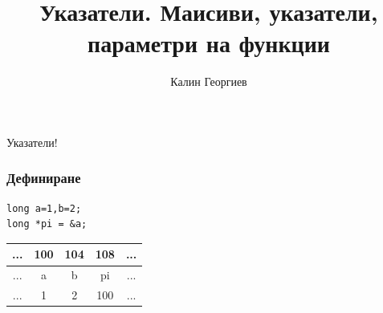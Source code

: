 \documentclass{beamer}
\begin{document}
\title[Увод в програмирането]{Указатели. Маисиви, указатели, параметри на функции}
\author{Калин Георгиев}
\frame{\titlepage}



\begin{frame}
\centerline{Указатели!}
\end{frame}



\begin{frame}[fragile]
\frametitle{Дефиниране}
\begin{flushleft}
\begin{lstlisting}
long a=1,b=2;
long *pi = &a;
\end{lstlisting}
\end{flushleft}

\begin{center}


\begin{tabular}{c | c | c | c | c}
... & 100 & 104 & 108 & ...\\\hline
... & a   & b   & pi  & ... \\\hline
... & 1   & 2   & 100 & ... \\

\end{tabular}
\end{center}
\end{frame}
\end{document}
